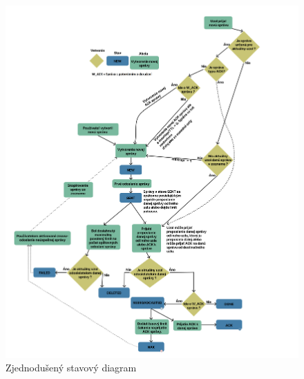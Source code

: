 \documentclass[slovak,master]{diploma}
\begin{document}
\begin{figure}[]
  \centering
  \includegraphics[width=1\textwidth]{Figures/state_flow_W.png}
  \caption{Zjednodušený stavový diagram}
  \label{fig:stateDiagram}
\end{figure}
\end{document}
